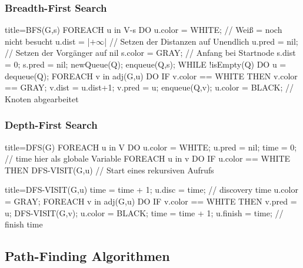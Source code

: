         \subsubsection{Breadth-First Search}
            \begin{ccode}[autogobble, escapeinside=||]{title={BFS(G,s)}}
            FOREACH u in V-{s} DO
                u.color = WHITE;        // Weiß = noch nicht besucht
                u.dist = |$+\infty$|            // Setzen der Distanzen auf Unendlich
                u.pred = nil;           // Setzen der Vorgänger auf nil
            s.color = GRAY;             // Anfang bei Startnode
            s.dist = 0;
            s.pred = nil;
            newQueue(Q);
            enqueue(Q,s);
            WHILE !isEmpty(Q) DO
                u = dequeue(Q); 
                FOREACH v in adj(G,u) DO
                    IF v.color == WHITE THEN
                        v.color == GRAY;
                        v.dist = u.dist+1;
                        v.pred = u;
                        enqueue(Q,v);
                u.color = BLACK;            // Knoten abgearbeitet
            \end{ccode}

        \subsubsection{Depth-First Search}
            \begin{ccode}[autogobble, escapeinside=||]{title={DFS(G)}}
            FOREACH u in V DO
                u.color = WHITE;
                u.pred = nil;
            time = 0;               // time hier als globale Variable
            FOREACH u in v DO
                IF u.color == WHITE THEN
                    DFS-VISIT(G,u)  // Start eines rekursiven Aufrufs
            \end{ccode}

            \begin{ccode}[autogobble, escapeinside=||]{title={DFS-VISIT(G,u)}}
            time = time + 1;
            u.disc = time;          // discovery time
            u.color = GRAY;
            FOREACH v in adj(G,u) DO
                IF v.color == WHITE THEN
                    v.pred = u;
                    DFS-VISIT(G,v);
            u.color = BLACK;
            time = time + 1;
            u.finish = time;        // finish time
            \end{ccode}

    \subsection{Path-Finding Algorithmen}
